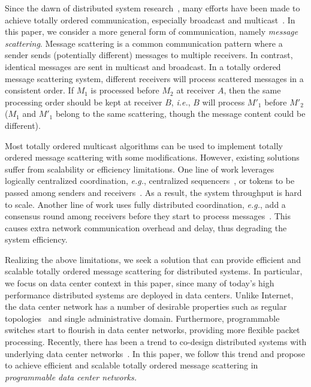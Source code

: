 Since the dawn of distributed system research~\cite{lamport1978time}, many efforts have been made to achieve totally ordered communication, especially broadcast and multicast~\cite{defago2004total}. In this paper, we consider a more general form of communication, namely \emph{message scattering}. Message scattering is a common communication pattern where a sender sends (potentially different) messages to multiple receivers. In contrast, identical messages are sent in multicast and broadcast. In a totally ordered message scattering system, different receivers will process scattered messages in a consistent order. If $M_1$ is processed before $M_2$ at receiver $A$, then the same processing order should be kept at receiver $B$, \textit{i.e.}, $B$ will process $M'_1$ before $M'_2$ ($M_1$ and $M'_1$ belong to the same scattering, though the message content could be different).

Most totally ordered multicast algorithms can be used to implement totally ordered message scattering with some modifications. However, existing solutions suffer from scalability or efficiency limitations. One line of work leverages logically centralized coordination, \textit{e.g.}, centralized sequencers~\cite{eris}, or tokens to be passed among senders and receivers~\cite{rajagopalan1989token,kim1997total,ekwall2004token}. As a result, the system throughput is hard to scale. Another line of work uses fully distributed coordination, \textit{e.g.}, add a consensus round among receivers before they start to process messages~\cite{lamport1978time,chandra1996unreliable}. This causes extra network communication overhead and delay, thus degrading the system efficiency.

Realizing the above limitations, we seek a solution that can provide efficient and scalable totally ordered message scattering for distributed systems. In particular, we focus on data center context in this paper, since many of today's high performance distributed systems are deployed in data centers. Unlike Internet, the data center network has a number of desirable properties such as regular topologies~\cite{leiserson1985fat,greenberg2009vl2} and single administrative domain. Furthermore, programmable switches start to flourish in data center networks, providing more flexible packet processing. Recently, there has been a trend to co-design distributed systems with underlying data center networks~\cite{eris,netcache-sosp17,dang2016paxos}. In this paper, we follow this trend and propose \sys to achieve efficient and scalable totally ordered message scattering in \emph{programmable data center networks.}   
 
